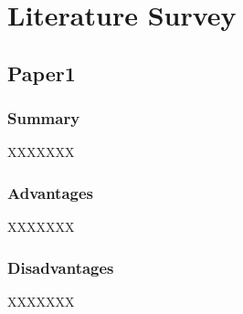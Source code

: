 \chapter{Literature Survey}

\section{Paper1}

\subsection{Summary}

XXXXXXX

\subsection{Advantages}

XXXXXXX
\subsection{Disadvantages}

XXXXXXX
